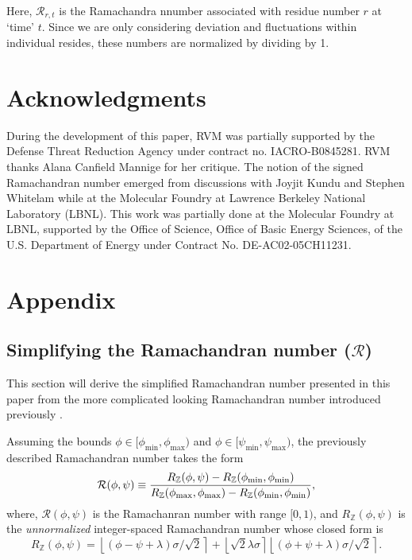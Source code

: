 \documentclass[fleqn,10pt,lineno]{wlpeerj} %
\newcommand{\round}[1]{\left \lfloor #1 \right \rceil }
\begin{document}
Here, $\mathcal{R}_{r,t}$ is the Ramachandra nnumber associated with residue number $r$ at `time' $t$. Since we are only considering deviation and fluctuations within individual resides, these numbers are normalized by dividing by 1.


\section*{Acknowledgments}

During the development of this paper, RVM was partially supported by the Defense Threat Reduction Agency under contract no. IACRO-B0845281. RVM thanks Alana Canfield Mannige for her critique. The notion of the signed Ramachandran number emerged from discussions with Joyjit Kundu and Stephen Whitelam while at the Molecular Foundry at Lawrence Berkeley National Laboratory (LBNL). This work was partially done at the Molecular Foundry at LBNL, supported by the Office of Science, Office of Basic Energy Sciences, of the U.S. Department of Energy under Contract No. DE-AC02-05CH11231.

\section*{Appendix}

\subsection*{Simplifying the Ramachandran number ($\mathcal{R}$)\label{sec:simplifyR}}

This section will derive the simplified Ramachandran number presented in this paper from the more complicated looking Ramachandran number introduced previously \citep{Mannige2016}. 

Assuming the bounds $\phi \in [\phi_\textrm{min},\phi_\textrm{max})$ and  $\phi \in [\psi_\textrm{min},\psi_\textrm{max})$, the previously described Ramachandran number takes the form 
\begin{equation}
{\mathcal{R}}(\phi,\psi) \equiv  \frac{R_\mathbb{Z}(\phi,\psi)-R_{\mathbb{Z}}(\phi_{\rm{min}},\phi_{\rm{min}})}
{R_{\mathbb{Z}}(\phi_{\rm{max}},\phi_{\rm{max}})-R_{\mathbb{Z}}(\phi_{\rm{min}},\phi_{\rm{min}})},\label{rama}
\end{equation}
where, $\mathcal{R}(\phi,\psi)$ is the Ramachanran number with range $[0,1)$, and $R_\mathbb{Z}(\phi,\psi)$ is the {\it unnormalized} integer-spaced Ramachandran number whose closed form is
\begin{equation}
R_\mathbb{Z}(\phi,\psi)  = \round{(\phi - \psi + \lambda)\sigma/\sqrt{2}}  + \round{\sqrt{2} \lambda\sigma} \round{(\phi+\psi + \lambda)\sigma/\sqrt{2}}.\label{ramachandran_raw}
\end{equation}
\end{document}
